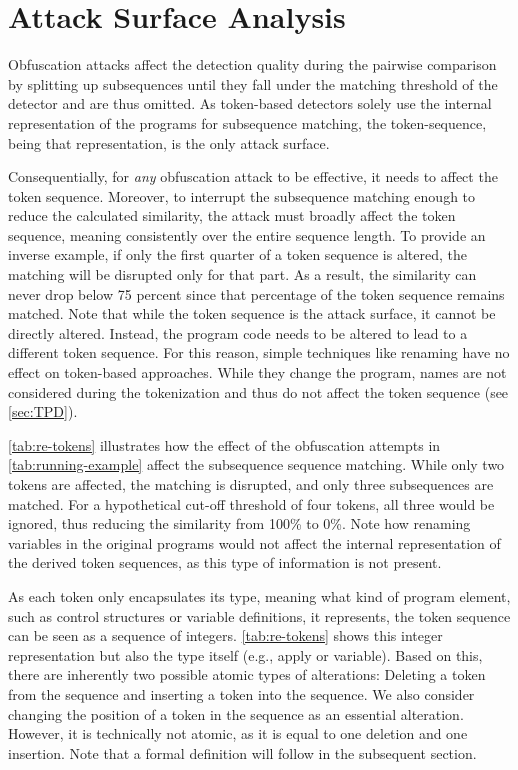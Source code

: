 \section{Attack Surface Analysis}\label{sec:threatmodel-analysis}

Obfuscation attacks affect the detection quality during the pairwise comparison by splitting up subsequences until they fall under the matching threshold of the detector and are thus omitted.
As token-based detectors solely use the internal representation of the programs for subsequence matching, the token-sequence, being that representation, is the only attack surface.

Consequentially, for \textit{any} obfuscation attack to be effective, it needs to affect the token sequence. Moreover, to interrupt the subsequence matching enough to reduce the calculated similarity, the attack must broadly affect the token sequence, meaning consistently over the entire sequence length. To provide an inverse example, if only the first quarter of a token sequence is altered, the matching will be disrupted only for that part. As a result, the similarity can never drop below 75 percent since that percentage of the token sequence remains matched.
Note that while the token sequence is the attack surface, it cannot be directly altered. Instead, the program code needs to be altered to lead to a different token sequence. For this reason, simple techniques like renaming have no effect on token-based approaches. While they change the program, names are not considered during the tokenization and thus do not affect the token sequence (see \autoref{sec:TPD}).

\autoref{tab:re-tokens} illustrates how the effect of the obfuscation attempts in \autoref{tab:running-example} affect the subsequence sequence matching. While only two tokens are affected, the matching is disrupted, and only three subsequences are matched. For a hypothetical cut-off threshold of four tokens, all three would be ignored, thus reducing the similarity from 100\% to 0\%. 
Note how renaming variables in the original programs would not affect the internal representation of the derived token sequences, as this type of information is not present.

As each token only encapsulates its type, meaning what kind of program element, such as control structures or variable definitions, it represents, the token sequence can be seen as a sequence of integers. \autoref{tab:re-tokens} shows this integer representation but also the type itself (e.g., apply or variable).
Based on this, there are inherently two possible atomic types of alterations: Deleting a token from the sequence and inserting a token into the sequence. We also consider changing the position of a token in the sequence as an essential alteration. However, it is technically not atomic, as it is equal to one deletion and one insertion. Note that a formal definition will follow in the subsequent section.

